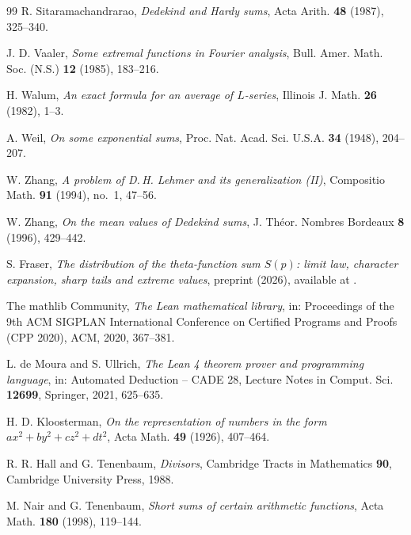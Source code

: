 \begin{thebibliography}{99}
 R. Sitaramachandrarao, \emph{Dedekind and Hardy sums}, Acta Arith. \textbf{48} (1987), 325--340.

 J. D. Vaaler, \emph{Some extremal functions in Fourier analysis}, Bull. Amer. Math. Soc. (N.S.) \textbf{12} (1985), 183--216.

 H. Walum, \emph{An exact formula for an average of $L$-series}, Illinois J. Math. \textbf{26} (1982), 1--3.

 A. Weil, \emph{On some exponential sums}, Proc. Nat. Acad. Sci. U.S.A. \textbf{34} (1948), 204--207.

 W. Zhang, \emph{A problem of D.\,H. Lehmer and its generalization (II)}, Compositio Math. \textbf{91} (1994), no.~1, 47--56.

 W. Zhang, \emph{On the mean values of Dedekind sums}, J. Th\'eor. Nombres Bordeaux \textbf{8} (1996), 429--442.

 S. Fraser, \emph{The distribution of the theta-function sum $S(p)$: limit law, character expansion, sharp tails and extreme values}, preprint (2026), available at \zenododoi.

 The mathlib Community, \emph{The Lean mathematical library}, in: Proceedings of the 9th ACM SIGPLAN International Conference on Certified Programs and Proofs (CPP 2020), ACM, 2020, 367--381.

 L. de Moura and S. Ullrich, \emph{The Lean 4 theorem prover and programming language}, in: Automated Deduction -- CADE 28, Lecture Notes in Comput. Sci. \textbf{12699}, Springer, 2021, 625--635.

 H. D. Kloosterman, \emph{On the representation of numbers in the form $ax^2+by^2+cz^2+dt^2$}, Acta Math. \textbf{49} (1926), 407--464.

 R. R. Hall and G. Tenenbaum, \emph{Divisors}, Cambridge Tracts in Mathematics \textbf{90}, Cambridge University Press, 1988.

 M. Nair and G. Tenenbaum, \emph{Short sums of certain arithmetic functions}, Acta Math. \textbf{180} (1998), 119--144.

\end{thebibliography}
